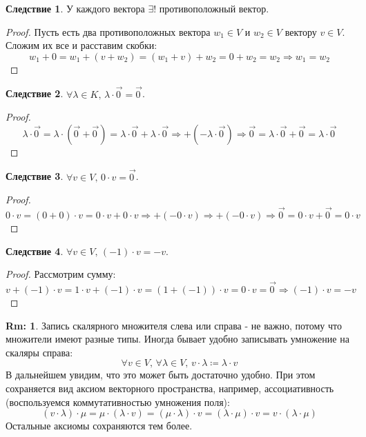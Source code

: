 \documentclass[12pt]{article}
\theoremstyle{definition}
\newtheorem{rem}{Rm:}
\newtheorem{corollary}{Следствие}
\newcommand{\vecm}[1]{\overrightarrow{#1\,}}
\begin{document}
\begin{corollary}
	У каждого вектора $\exists!$ противоположный вектор.
\end{corollary}
\begin{proof}
	Пусть есть два противоположных вектора $w_1 \in V$ и $w_2 \in V$ вектору $v \in V$. Сложим их все и расставим скобки:
	$$
		w_1 + 0 = w_1 + (v+ w_2) = (w_1 + v) + w_2 = 0 + w_2 = w_2 \Rightarrow w_1 = w_2
	$$
\end{proof}

\begin{corollary}
	$\forall \lambda \in K, \, \lambda {\cdot}\vecm{0} = \vecm{0}$.
\end{corollary}
\begin{proof}
	$$
		\lambda{\cdot}\vecm{0} = \lambda{\cdot}\left(\vecm{0} + \vecm{0}\right) = \lambda{\cdot}\vecm{0} + \lambda{\cdot}\vecm{0} \Rightarrow +\left(-\lambda{\cdot}\vecm{0}\right) \Rightarrow \vecm{0} = \lambda{\cdot}\vecm{0} + \vecm{0} = \lambda{\cdot}\vecm{0}
	$$
\end{proof}
\begin{corollary}
	$\forall v \in V, \, 0{\cdot}v = \vecm{0}$.
\end{corollary}
\begin{proof}
	$$
		0{\cdot}v = (0 + 0){\cdot}v = 0{\cdot}v + 0{\cdot}v \Rightarrow +(-0{\cdot}v) \Rightarrow +\left(-0{\cdot}v\right) \Rightarrow \vecm{0} = 0{\cdot}v + \vecm{0} = 0{\cdot}v
	$$
\end{proof}

\begin{corollary}
	$\forall v \in V, \, (-1){\cdot}v = - v$.
\end{corollary}
\begin{proof}
	Рассмотрим сумму:
	$$
		v + (-1){\cdot}v = 1{\cdot}v + (-1){\cdot}v = (1 + (-1)){\cdot}v = 0{\cdot}v = \vecm{0} \Rightarrow (-1){\cdot}v = - v
	$$
\end{proof}
\begin{rem}
	Запись скалярного множителя слева или справа - не важно, потому что множители имеют разные типы. Иногда бывает удобно записывать умножение на скаляры справа:
	$$
		\forall v \in V, \, \forall \lambda \in V, \, v{\cdot}\lambda \coloneqq \lambda{\cdot}v
	$$
	В дальнейшем увидим, что это может быть достаточно удобно. При этом сохраняется вид аксиом векторного пространства, например, ассоциативность (воспользуемся коммутативностью умножения поля):
	$$
		(v{\cdot}\lambda){\cdot}\mu = \mu{\cdot}(\lambda{\cdot} v) = (\mu {\cdot}\lambda){\cdot}v = (\lambda{\cdot}\mu){\cdot}v = v{\cdot}(\lambda{\cdot}\mu)
	$$
	Остальные аксиомы сохраняются тем более.
\end{rem}
\newpage
\end{document}
